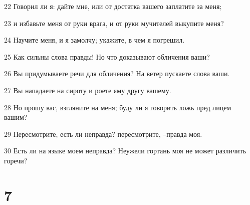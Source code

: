 \par 22 Говорил ли я: дайте мне, или от достатка вашего заплатите за меня;
\par 23 и избавьте меня от руки врага, и от руки мучителей выкупите меня?
\par 24 Научите меня, и я замолчу; укажите, в чем я погрешил.
\par 25 Как сильны слова правды! Но что доказывают обличения ваши?
\par 26 Вы придумываете речи для обличения? На ветер пускаете слова ваши.
\par 27 Вы нападаете на сироту и роете яму другу вашему.
\par 28 Но прошу вас, взгляните на меня; буду ли я говорить ложь пред лицем вашим?
\par 29 Пересмотрите, есть ли неправда? пересмотрите, --правда моя.
\par 30 Есть ли на языке моем неправда? Неужели гортань моя не может различить горечи?

\chapter{7}

